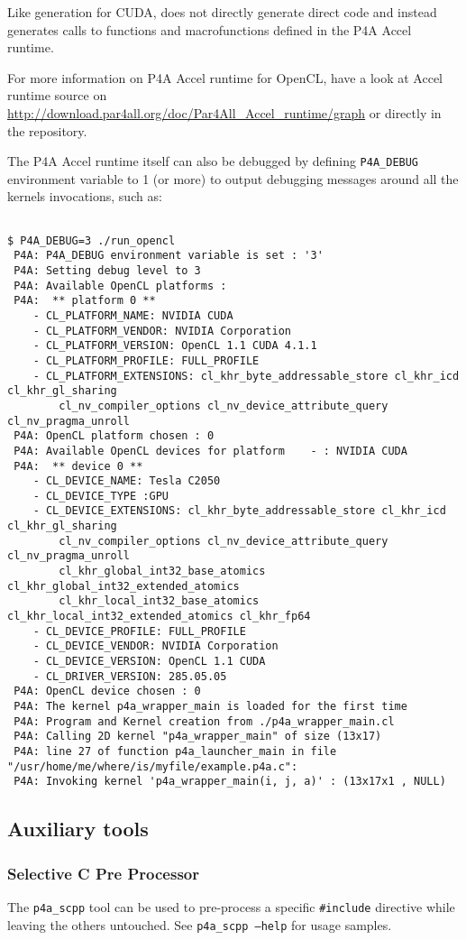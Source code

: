 \documentclass[a4paper]{article}
\begin{document}
Like \Apfa generation for CUDA,  \Apfa does not directly generate
direct \Aopencl code and instead generates calls to functions and
macrofunctions defined in the P4A Accel runtime.

For more information on P4A Accel runtime for OpenCL, have a look at \Apfa Accel runtime source on 
\url{http://download.par4all.org/doc/Par4All_Accel_runtime/graph} or
directly in the \Agit repository.

The P4A Accel runtime itself can also be debugged by defining \verb|P4A_DEBUG| 
environment variable to 1 (or more) to output debugging messages around all
the \Aopencl kernels invocations, such as: {\scriptsize
\begin{verbatim}

$ P4A_DEBUG=3 ./run_opencl
 P4A: P4A_DEBUG environment variable is set : '3'
 P4A: Setting debug level to 3
 P4A: Available OpenCL platforms :
 P4A:  ** platform 0 **
    - CL_PLATFORM_NAME: NVIDIA CUDA
    - CL_PLATFORM_VENDOR: NVIDIA Corporation
    - CL_PLATFORM_VERSION: OpenCL 1.1 CUDA 4.1.1
    - CL_PLATFORM_PROFILE: FULL_PROFILE
    - CL_PLATFORM_EXTENSIONS: cl_khr_byte_addressable_store cl_khr_icd cl_khr_gl_sharing 
        cl_nv_compiler_options cl_nv_device_attribute_query cl_nv_pragma_unroll 
 P4A: OpenCL platform chosen : 0
 P4A: Available OpenCL devices for platform    - : NVIDIA CUDA
 P4A:  ** device 0 **
    - CL_DEVICE_NAME: Tesla C2050
    - CL_DEVICE_TYPE :GPU
    - CL_DEVICE_EXTENSIONS: cl_khr_byte_addressable_store cl_khr_icd cl_khr_gl_sharing 
        cl_nv_compiler_options cl_nv_device_attribute_query cl_nv_pragma_unroll  
        cl_khr_global_int32_base_atomics cl_khr_global_int32_extended_atomics 
        cl_khr_local_int32_base_atomics cl_khr_local_int32_extended_atomics cl_khr_fp64 
    - CL_DEVICE_PROFILE: FULL_PROFILE
    - CL_DEVICE_VENDOR: NVIDIA Corporation
    - CL_DEVICE_VERSION: OpenCL 1.1 CUDA
    - CL_DRIVER_VERSION: 285.05.05
 P4A: OpenCL device chosen : 0
 P4A: The kernel p4a_wrapper_main is loaded for the first time
 P4A: Program and Kernel creation from ./p4a_wrapper_main.cl
 P4A: Calling 2D kernel "p4a_wrapper_main" of size (13x17)
 P4A: line 27 of function p4a_launcher_main in file "/usr/home/me/where/is/myfile/example.p4a.c":
 P4A: Invoking kernel 'p4a_wrapper_main(i, j, a)' : (13x17x1 , NULL)
\end{verbatim}

}

\subsection{Auxiliary tools}

\subsubsection{Selective C Pre Processor}

The \texttt{p4a\_scpp} tool can be used to pre-process a specific
\texttt{\#include} directive while leaving the others untouched. See
\texttt{p4a\_scpp --help} for usage samples.

\end{document}
